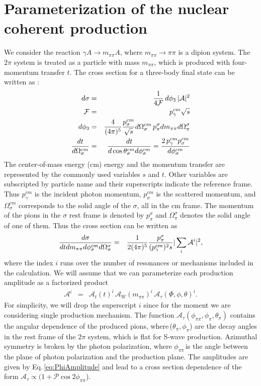 \section{Parameterization of the nuclear coherent production  \label{sec:NCsigma}}
We consider the reaction $\gamma A \rightarrow m_{\pi\pi} A$, where $m_{\pi\pi}\rightarrow \pi\pi$ is a dipion system.
The $2\pi$ system is treated as a particle with mass $m_{\pi\pi}$, which is produced with  four-momentum transfer $t$.  
The cross section for a three-body final state can be written as \cite{BNLQGS020900}:
\begin{eqnarray}
d\sigma & = & \frac{1}{4\mathcal{F}} \, d\phi_3 \, |\mathcal{A}|^2 \\
\mathcal{F} & = & p_\gamma^{cm} \sqrt{s} \\
d\phi_3 & = & \frac{4}{(4\pi)^5} {p_\sigma^{cm} \over \sqrt{s}} d\Omega_\sigma^{cm}\, p_\pi^{\sigma} dm_{\pi\pi} d\Omega_\pi^{\sigma} \\
{dt \over d\Omega_\sigma^{cm} } & = & {dt \over d\cos{\theta}_\sigma^{cm} d\phi_\sigma^{cm} } = {2\, p_\gamma^{cm} p_\sigma^{cm}  \over d\phi_\sigma^{cm} }
\end{eqnarray}
The center-of-mass energy (cm) energy and the momentum transfer are represented by the commonly used variables $s$ and $t$. 
Other variables are subscripted by particle name and their superscripts indicate the reference frame. Thus $p_\gamma^{cm}$ is the incident photon momentum, $p_\sigma^{cm}$ is the scattered momentum,  and $\Omega_\sigma^{cm}$ corresponds to the solid angle of the $\sigma$, all in the cm frame.  
The momentum of the pions in the $\sigma$ rest frame is denoted by $p_\pi^{\sigma}$ and $\Omega_\pi^{\sigma}$ denotes the solid angle of  one of them.
Thus the cross section can be written as
\begin{eqnarray}
{d\sigma \over dt dm_{\pi\pi} d\phi_{\sigma}^{cm} d\Omega_\pi^{\sigma} } & = & {1 \over 2(4\pi)^5} {p_\pi^\sigma \over (p_\gamma^{cm})^2 s } |\sum_i \mathcal{A}^i|^2 ,     \label{eq:sigma_phi3}
\end{eqnarray}
where the index $i$ runs over the number of resonances or mechanisms included in the calculation. We  will assume that we can parameterize each production amplitude as a factorized product
\begin{eqnarray}
\mathcal{A}^i & = & \mathcal{A}_t(t)^i \, \mathcal{A}_W(m_{\pi\pi})^i \, \mathcal{A}_\tau(\Phi, \phi, \theta)^i.
\end{eqnarray}
For simplicity, we will drop the superscript $i$ since for the moment we are considering  single production mechanism.
The function $\mathcal{A}_\tau(\phi_{\pi\pi}, \phi_\pi, \theta_\pi)$ contains the angular dependence of the produced pions, 
where\,($\theta_\pi,\phi_\pi$)  are the decay angles in the rest frame of the $2\pi$ system, which is flat for S-wave production. 
Azimuthal symmetry is broken by the photon polarization, where $\phi_{\pi\pi}$\,is the angle between the plane of photon polarization and the production plane. The amplitudes are
given by Eq.\,\ref{eq:PhiAmplitude} and lead to a cross section dependence of the form $\mathcal{A}_\tau \propto (1 + \mathcal{P} \cos{2\phi_{\pi\pi}}$). 

